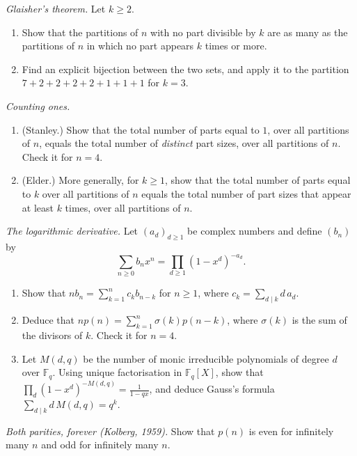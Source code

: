 \begin{exercise}[$\star\star$]\label{pb:glaisherthm}
\emph{Glaisher's theorem.} Let $k\ge2$.
\begin{enumerate}[label=(\alph*)]
\item Show that the partitions of $n$ with no part divisible by $k$ are as many as the partitions of $n$ in which no part
appears $k$ times or more.
\item Find an explicit bijection between the two sets, and apply it to the partition $7+2+2+2+2+1+1+1$ for $k=3$.
\end{enumerate}
\end{exercise}

\begin{exercise}[$\star\star$]\label{pb:stanley}
\emph{Counting ones.}
\begin{enumerate}[label=(\alph*)]
\item (Stanley.) Show that the total number of parts equal to $1$, over all partitions of $n$, equals the total number of
\emph{distinct} part sizes, over all partitions of $n$. Check it for $n=4$.
\item (Elder.) More generally, for $k\ge1$, show that the total number of parts equal to $k$ over all partitions of $n$ equals the
total number of part sizes that appear at least $k$ times, over all partitions of $n$.
\end{enumerate}
\end{exercise}

\begin{exercise}[$\star\star$]\label{pb:eulerlog}
\emph{The logarithmic derivative.} Let $(a_d)_{d\ge1}$ be complex numbers and define $(b_n)$ by
\[
\sum_{n\ge0}b_nx^n=\prod_{d\ge1}(1-x^d)^{-a_d}.
\]
\begin{enumerate}[label=(\alph*)]
\item Show that $nb_n=\sum_{k=1}^nc_kb_{n-k}$ for $n\ge1$, where $c_k=\sum_{d\mid k}d\,a_d$.
\item Deduce that $np(n)=\sum_{k=1}^n\sigma(k)p(n-k)$, where $\sigma(k)$ is the sum of the divisors of $k$. Check it for $n=4$.
\item Let $M(d,q)$ be the number of monic irreducible polynomials of degree $d$ over $\mathbb F_q$. Using unique factorisation in
$\mathbb F_q[X]$, show that $\prod_d(1-x^d)^{-M(d,q)}=\frac1{1-qx}$, and deduce Gauss's formula $\sum_{d\mid k}d\,M(d,q)=q^k$.
\end{enumerate}
\end{exercise}

\begin{exercise}[$\star\star$]\label{pb:kolberg}
\emph{Both parities, forever (Kolberg, 1959).} Show that $p(n)$ is even for infinitely many $n$ and odd for infinitely many $n$.
\end{exercise}

